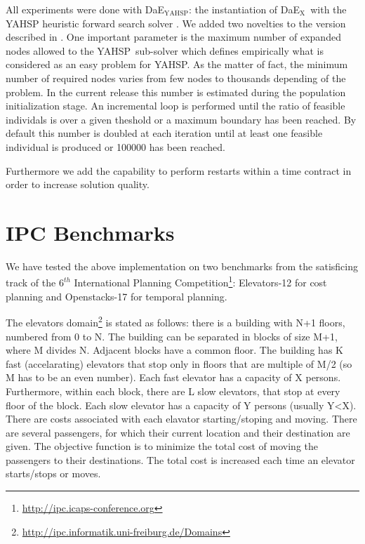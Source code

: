\documentclass{sig-alternate}
\newcommand{\DAEX}{{\sc DaE$_{\text{X}}$}}
\newcommand{\DAEYAHSP}{{\sc DaE$_{\text{YAHSP}}$}}
\newcommand{\YAHSP}{{\sc YAHSP}}
\begin{document}
All experiments were done with \DAEYAHSP: the instantiation of \DAEX\ with the YAHSP heuristic forward search solver \cite{yahsp:icaps2004}. %
We added two novelties to the version described in \cite{dae:icaps2010}. 
One important parameter is the maximum number of expanded nodes allowed to the \YAHSP\ sub-solver which defines empirically what is considered as an easy problem for \YAHSP. As the matter of fact, the minimum number of required nodes varies from few nodes to thousands depending of the problem. 
In the current release this number is estimated during the population initialization stage. An incremental loop is performed until the ratio of feasible individals is over a given theshold or a maximum boundary has been reached. By default this number is doubled at each iteration until at least one feasible individual is produced or 100000 has been reached.

Furthermore we add the capability to perform restarts within a time contract in order to increase solution quality.

\section{IPC Benchmarks}

We have tested the above implementation on two benchmarks from the satisficing track of the $6^{th}$ International Planning Competition\footnote{\url{http://ipc.icaps-conference.org}}: Elevators-12 for cost planning and Openstacks-17 for temporal planning.

The elevators domain\footnote{\url{http://ipc.informatik.uni-freiburg.de/Domains}} is stated as follows: there is a building with N+1 floors, numbered from 0 to N. The building can be separated in blocks of size M+1, where M divides N. Adjacent blocks have a common floor. The building has K fast (accelarating) elevators that stop only in floors that are multiple of M/2 (so M has to be an even number). Each fast elevator has a capacity of X persons. Furthermore, within each block, there are L slow elevators, that stop at every floor of the block. Each slow elevator has a capacity of Y persons (usually Y<X).
There are costs associated with each elavator starting/stoping and moving. There are several passengers, for which their current location and their destination are given.
The objective function is to minimize the total cost of moving the passengers to their destinations. The total cost is increased each time an elevator starts/stops or moves.
\end{document}
